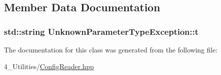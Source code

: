 \subsection{Member Data Documentation}
\subsubsection[{\texorpdfstring{t}{t}}]{\setlength{\rightskip}{0pt plus 5cm}std\+::string Unknown\+Parameter\+Type\+Exception\+::t\hspace{0.3cm}{\ttfamily [protected]}}\hypertarget{class_unknown_parameter_type_exception_aea7dea95ac3aa1eea258de5c245797c7}{}\label{class_unknown_parameter_type_exception_aea7dea95ac3aa1eea258de5c245797c7}


The documentation for this class was generated from the following file\+:\begin{DoxyCompactItemize}
\item 
4\+\_\+\+Utilities/\hyperlink{_config_reader_8hpp}{Config\+Reader.\+hpp}\end{DoxyCompactItemize}
